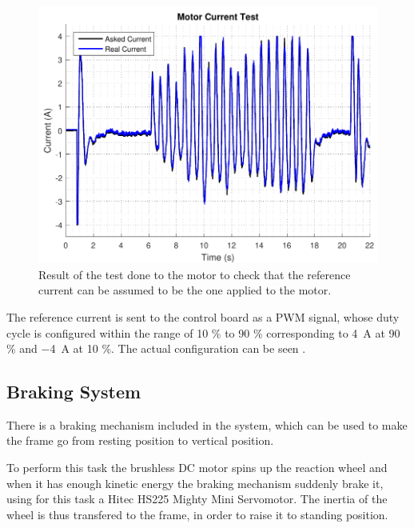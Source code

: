 \begin{figure}[H]
	\includegraphics[scale=.65]{figures/motorCurrentTest}
	\centering
	\caption{Result of the test done to the motor to check that the reference current can be assumed to be the one applied to the motor.}
\end{figure} \label{motorCurrentTest2}

The reference current is sent to the control board as a PWM signal, whose duty cycle is configured within the range of 10 \% to 90 \% corresponding to \SI{4}{A} at 90 \% and \SI{-4}{A} at 10 \%. The actual configuration can be seen .


\subsection{Braking System}
There is a braking mechanism included in the system, which can be used to make the frame go from resting position to vertical position.

To perform this task the brushless DC motor spins up the reaction wheel and when it has enough kinetic energy the braking mechanism suddenly brake it, using for this task a Hitec HS225 Mighty Mini Servomotor. The inertia of the wheel is thus transfered to the frame, in order to raise it to standing position.


